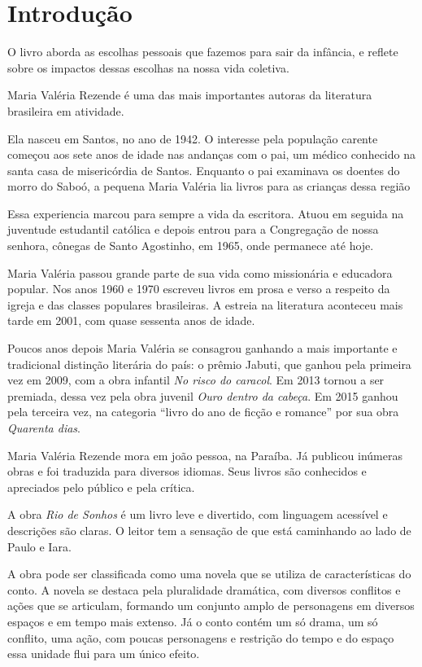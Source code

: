 \documentclass[12pt]{extarticle}
\begin{document}
\tableofcontents

\section{Introdução}

O livro aborda as escolhas pessoais  que fazemos para sair da infância, e 
reflete sobre os impactos dessas escolhas na nossa vida coletiva.  

Maria Valéria Rezende é uma das mais importantes autoras da literatura brasileira  em atividade.

Ela nasceu em Santos,  no ano de 1942. 
O interesse pela população carente  começou aos sete anos de idade  nas andanças com o pai,
um médico conhecido na santa casa de misericórdia de Santos. 
Enquanto o pai examinava os doentes do morro do Saboó,  a pequena Maria Valéria lia 
livros para as crianças dessa região 

Essa experiencia marcou para sempre a vida da escritora.
Atuou em seguida na juventude estudantil católica e depois entrou 
para a Congregação de nossa senhora, cônegas de Santo Agostinho,  
em 1965, onde permanece até hoje.

Maria Valéria  passou grande parte de sua vida como missionária e educadora popular.
Nos anos 1960 e 1970  escreveu livros em prosa e verso  a respeito da igreja e das classes populares brasileiras.  
A estreia na literatura aconteceu mais tarde  em 2001,  com quase sessenta anos de idade.

Poucos anos depois Maria Valéria se consagrou  ganhando a mais importante e tradicional distinção literária do país:  o prêmio Jabuti, que ganhou pela primeira vez em 2009,  com a obra infantil  \textit{No risco do caracol}. 
Em 2013  tornou a ser premiada,  dessa vez pela obra juvenil  \textit{Ouro dentro da cabeça}.
Em 2015 ganhou pela terceira vez, na categoria ``livro do ano de ficção e romance''  por sua obra 
\textit{Quarenta dias}.

Maria Valéria Rezende  mora em joão pessoa, na Paraíba. 
Já publicou inúmeras obras  e foi traduzida para diversos idiomas.
Seus livros são conhecidos  e apreciados pelo público  e pela crítica.

A obra \textit{Rio de Sonhos}
é um livro leve e divertido, com linguagem acessível e descrições são claras.
O leitor tem a sensação de que está caminhando ao lado de Paulo e Iara. 

A obra pode ser classificada como uma novela que se utiliza de características do conto. 
A novela  se destaca pela pluralidade dramática,  com diversos conflitos e ações que se articulam,  formando um conjunto amplo de personagens em diversos espaços e em tempo mais extenso.
Já o conto  contém um só drama,  um só conflito,  uma ação,  com poucas personagens e restrição do tempo e do espaço essa unidade flui para um único efeito.
\end{document}
